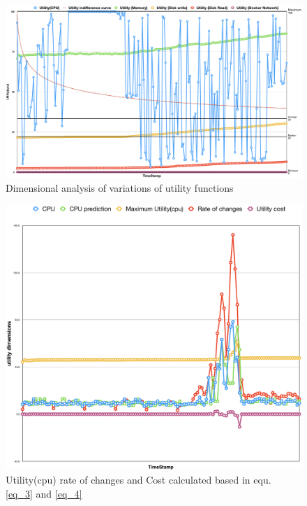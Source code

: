 \documentclass[graybox]{svmult}
\begin{document}
\begin{figure}[!ht] 
\includegraphics[scale=0.2]{demand}
\caption{ Dimensional analysis of variations of utility functions}
\label{fig_demand}
\end{figure}
\begin{figure}[!ht] 
\includegraphics[scale=0.23]{changes}
\caption{Utility(cpu) rate of changes and Cost calculated based in equ. \ref{eq_3} and \ref{eq_4}}
\label{fig_changes}
\end{figure}
\end{document}
